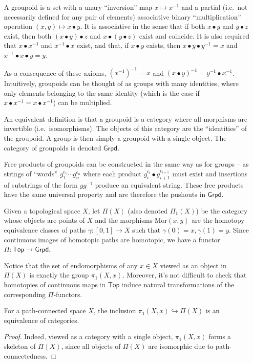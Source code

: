 \begin{defn}[Groupoid]
    A groupoid is a set with a unary ``inversion'' map $x\mapsto x^{-1}$ and a partial (i.e.\ not necessarily defined for any pair of elements) associative binary ``multiplication'' operation $(x,y)\mapsto x\bullet y$. It is associative in the sense that if both $x\bullet y$ and $y\bullet z$ exist, then both $(x\bullet y)\bullet z$ and $x\bullet (y\bullet z)$ exist and coincide. It is also required that $x\bullet x^{-1}$ and $x^{-1}\bullet x$ exist, and that, if $x\bullet y$ exists, then $x\bullet y\bullet y^{-1}=x$ and $x^{-1}\bullet x\bullet y=y$.

   As a consequence of these axioms, $(x^{-1})^{-1}=x$ and $(x\bullet y)^{-1}=y^{-1}\bullet x^{-1}$. Intuitively, groupoids can be thought of as groups with many identities, where only elements belonging to the same identity (which is the case if $x\bullet x^{-1}=x\bullet x^{-1}$) can be multiplied. 
    
    An equivalent definition is that a groupoid is a category where all morphisms are invertible (i.e.\ isomorphisms). The objects of this category are the ``identities'' of the groupoid. A group is then simply a groupoid with a single object. The category of groupoids is denoted $\mathsf{Grpd}$.
\end{defn}

Free products of groupoids can be constructed in the same way as for groups -- as strings of ``words'' $g_1^{\epsilon_1} \cdots g_n^{\epsilon_n}$ where each product $g_i^{\epsilon_i}\bullet g_{i+1}^{\epsilon_{i+1}}$ must exist and insertions of substrings of the form $gg^{-1}$ produce an equivalent string. These free products have the same universal property and are therefore the pushouts in $\mathsf{Grpd}$.

\begin{defn}
    Given a topological space $X$, let $\Pi(X)$ (also denoted $\Pi_1(X)$) be the category whose objects are points of $X$ and the morphisms $\mathrm{Mor}(x,y)$ are the homotopy equivalence classes of paths $\gamma:[0,1]\to X$ such that $\gamma(0)=x, \gamma(1)=y$. Since continuous images of homotopic paths are homotopic, we have a functor $\Pi:\mathsf{Top}\to \mathsf{Grpd}$.
\end{defn}
Notice that the set of endomorphisms of any $x\in X$ viewed as an object in $\Pi(X)$ is exactly the group $\pi_1(X,x)$. Moreover, it's not difficult to check that homotopies of continuous maps in $\mathsf{Top}$ induce natural transformations of the corresponding $\Pi$-functors.
\begin{prop}
    For a path-connected space $X$, the inclusion $\pi_1(X,x)\hookrightarrow \Pi(X)$ is an equivalence of categories.
\end{prop}
\begin{proof}
    Indeed, viewed as a category with a single object, $\pi_1(X,x)$ forms a skeleton of $\Pi(X)$, since all objects of $\Pi(X)$ are isomorphic due to path-connectedness.
\end{proof}

